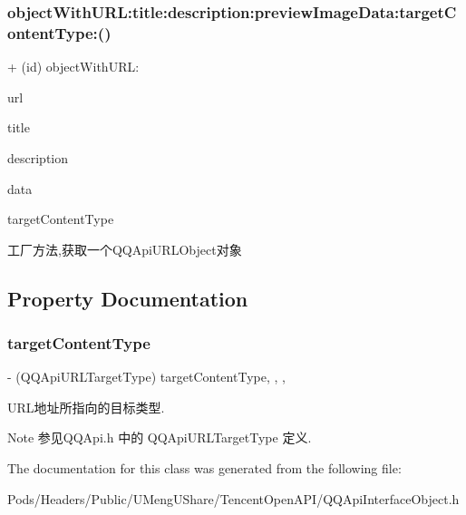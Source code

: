 \subsubsection{\texorpdfstring{object\+With\+U\+R\+L\+:title\+:description\+:preview\+Image\+Data\+:target\+Content\+Type\+:()}{objectWithURL:title:description:previewImageData:targetContentType:()}\hspace{0.1cm}{\footnotesize\ttfamily [2/2]}}
{\footnotesize\ttfamily + (id) object\+With\+U\+R\+L\+: \begin{DoxyParamCaption}\item[{(N\+S\+U\+RL $\ast$)}]{url }\item[{title:(N\+S\+String $\ast$)}]{title }\item[{description:(N\+S\+String $\ast$)}]{description }\item[{previewImageData:(N\+S\+Data $\ast$)}]{data }\item[{targetContentType:(Q\+Q\+Api\+U\+R\+L\+Target\+Type)}]{target\+Content\+Type }\end{DoxyParamCaption}}

工厂方法,获取一个\+Q\+Q\+Api\+U\+R\+L\+Object对象 

\subsection{Property Documentation}
\mbox{\label{interface_q_q_api_u_r_l_object_ac63300bde7ff3c111e301789ee0d6557}} 
\subsubsection{\texorpdfstring{target\+Content\+Type}{targetContentType}}
{\footnotesize\ttfamily -\/ (Q\+Q\+Api\+U\+R\+L\+Target\+Type) target\+Content\+Type\hspace{0.3cm}{\ttfamily [read]}, {\ttfamily [write]}, {\ttfamily [nonatomic]}, {\ttfamily [assign]}}

U\+R\+L地址所指向的目标类型. \begin{DoxyNote}{Note}
参见\+Q\+Q\+Api.\+h 中的 Q\+Q\+Api\+U\+R\+L\+Target\+Type 定义. 
\end{DoxyNote}


The documentation for this class was generated from the following file\+:\begin{DoxyCompactItemize}
\item 
Pods/\+Headers/\+Public/\+U\+Meng\+U\+Share/\+Tencent\+Open\+A\+P\+I/Q\+Q\+Api\+Interface\+Object.\+h\end{DoxyCompactItemize}
